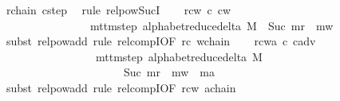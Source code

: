 \begin{isabellebody}
\ r{\isacharunderscore}{\kern0pt}chain\ c{\isacharunderscore}{\kern0pt}step\ \isamarkupfalse%
\ {\isacharparenleft}{\kern0pt}rule\ relpow{\isacharunderscore}{\kern0pt}Suc{\isacharunderscore}{\kern0pt}I{\isacharparenright}{\kern0pt}\isanewline
\ \ \isamarkupfalse%
\ rcw{\isacharcolon}{\kern0pt}\ {\isachardoublequoteopen}{\isacharparenleft}{\kern0pt}c{\isacharprime}{\kern0pt}{\isacharcomma}{\kern0pt}\ c{\isacharunderscore}{\kern0pt}w{\isacharparenright}{\kern0pt}\isanewline
\ \ \ \ \ \ \ \ \ \ \ \ \ \ \ {\isasymin}\ {\isacharparenleft}{\kern0pt}mttm{\isacharunderscore}{\kern0pt}step\ {\isacharparenleft}{\kern0pt}alphabet{\isacharunderscore}{\kern0pt}reduce{\isacharunderscore}{\kern0pt}delta\ M{\isacharparenright}{\kern0pt}{\isacharparenright}{\kern0pt}\ {\isacharcircum}{\kern0pt}{\isacharcircum}{\kern0pt}\ {\isacharparenleft}{\kern0pt}Suc\ m{\isacharunderscore}{\kern0pt}r\ {\isacharplus}{\kern0pt}\ m{\isacharunderscore}{\kern0pt}w{\isacharparenright}{\kern0pt}{\isachardoublequoteclose}\isanewline
\ \ \ \ \isamarkupfalse%
\ {\isacharparenleft}{\kern0pt}subst\ relpow{\isacharunderscore}{\kern0pt}add{\isacharparenright}{\kern0pt}\ {\isacharparenleft}{\kern0pt}rule\ relcompI{\isacharbrackleft}{\kern0pt}OF\ rc\ w{\isacharunderscore}{\kern0pt}chain{\isacharbrackright}{\kern0pt}{\isacharparenright}{\kern0pt}\isanewline
\ \ \isamarkupfalse%
\ rcwa{\isacharcolon}{\kern0pt}\ {\isachardoublequoteopen}{\isacharparenleft}{\kern0pt}c{\isacharprime}{\kern0pt}{\isacharcomma}{\kern0pt}\ c{\isacharunderscore}{\kern0pt}adv{\isacharparenright}{\kern0pt}\isanewline
\ \ \ \ \ \ \ \ \ \ \ \ \ \ \ \ {\isasymin}\ {\isacharparenleft}{\kern0pt}mttm{\isacharunderscore}{\kern0pt}step\ {\isacharparenleft}{\kern0pt}alphabet{\isacharunderscore}{\kern0pt}reduce{\isacharunderscore}{\kern0pt}delta\ M{\isacharparenright}{\kern0pt}{\isacharparenright}{\kern0pt}\isanewline
\ \ \ \ \ \ \ \ \ \ \ \ \ \ \ \ \ \ \ \ \ {\isacharcircum}{\kern0pt}{\isacharcircum}{\kern0pt}\ {\isacharparenleft}{\kern0pt}Suc\ m{\isacharunderscore}{\kern0pt}r\ {\isacharplus}{\kern0pt}\ m{\isacharunderscore}{\kern0pt}w\ {\isacharplus}{\kern0pt}\ m{\isacharunderscore}{\kern0pt}a{\isacharparenright}{\kern0pt}{\isachardoublequoteclose}\isanewline
\ \ \ \ \isamarkupfalse%
\ {\isacharparenleft}{\kern0pt}subst\ relpow{\isacharunderscore}{\kern0pt}add{\isacharparenright}{\kern0pt}\ {\isacharparenleft}{\kern0pt}rule\ relcompI{\isacharbrackleft}{\kern0pt}OF\ rcw\ a{\isacharunderscore}{\kern0pt}chain{\isacharbrackright}{\kern0pt}{\isacharparenright}{\kern0pt}\isanewline

\end{isabellebody}

